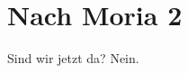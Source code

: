 \newpage
\section{Nach Moria 2}
\label{sec:nach-moria2}
\charaktere{\Frodo, \Sum, \Gimli, \Legolars, \Gandalf}
\hauptbeamer{-}
\sound{-}

\begin{verseplay}[7em]
\s{\Sum} Sind wir jetzt da?
\s{\Gandalf} Nein.
\end{verseplay}

